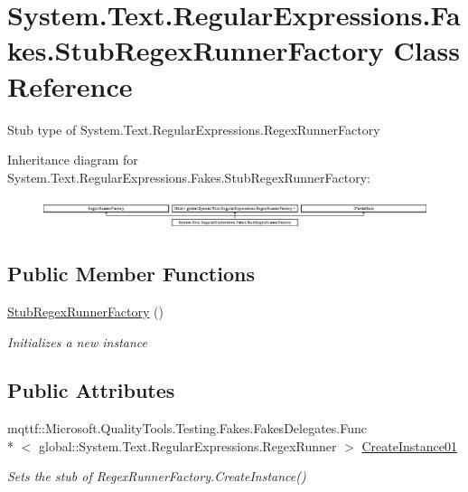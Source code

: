\hypertarget{class_system_1_1_text_1_1_regular_expressions_1_1_fakes_1_1_stub_regex_runner_factory}{\section{System.\-Text.\-Regular\-Expressions.\-Fakes.\-Stub\-Regex\-Runner\-Factory Class Reference}
\label{class_system_1_1_text_1_1_regular_expressions_1_1_fakes_1_1_stub_regex_runner_factory}
}


Stub type of System.\-Text.\-Regular\-Expressions.\-Regex\-Runner\-Factory 


Inheritance diagram for System.\-Text.\-Regular\-Expressions.\-Fakes.\-Stub\-Regex\-Runner\-Factory\-:\begin{figure}[H]
\begin{center}
\leavevmode
\includegraphics[height=0.895284cm]{class_system_1_1_text_1_1_regular_expressions_1_1_fakes_1_1_stub_regex_runner_factory}
\end{center}
\end{figure}
\subsection*{Public Member Functions}
\begin{DoxyCompactItemize}
\item 
\hyperlink{class_system_1_1_text_1_1_regular_expressions_1_1_fakes_1_1_stub_regex_runner_factory_af710c22aa4f485e42fb0b8caa0790cb1}{Stub\-Regex\-Runner\-Factory} ()
\begin{DoxyCompactList}\small\item\em Initializes a new instance\end{DoxyCompactList}\end{DoxyCompactItemize}
\subsection*{Public Attributes}
\begin{DoxyCompactItemize}
\item 
mqttf\-::\-Microsoft.\-Quality\-Tools.\-Testing.\-Fakes.\-Fakes\-Delegates.\-Func\\*
$<$ global\-::\-System.\-Text.\-Regular\-Expressions.\-Regex\-Runner $>$ \hyperlink{class_system_1_1_text_1_1_regular_expressions_1_1_fakes_1_1_stub_regex_runner_factory_a4474afaa58b20e88a8424cc4ecf6f09e}{Create\-Instance01}
\begin{DoxyCompactList}\small\item\em Sets the stub of Regex\-Runner\-Factory.\-Create\-Instance()\end{DoxyCompactList}\end{DoxyCompactItemize}
